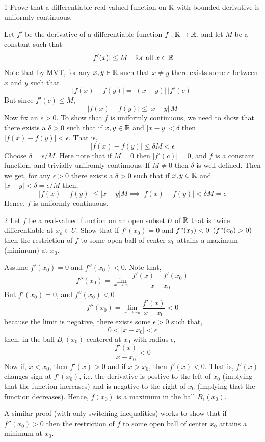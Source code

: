 \documentclass[12pt]{article}
\begin{document}


\begin{problem}{1}
    Prove that a differentiable real-valued function on $\mathbb R$ with bounded derivative is uniformly continuous.
\end{problem}

\begin{solution}
    \bbni

    Let $f'$ be the derivative of a differentiable function $f: \mathbb R \to \mathbb R$, and let $M$ be a constant such that 
    \[|f'(x)| \leq M \quad \text{for all $x \in \mathbb R$}\] 
    Note that by MVT, for any $x, y \in \mathbb R$ such that $x \neq y$ there exists some $c$ between $x$ and $y$ such that 
    \[|f(x) - f(y)| = |(x - y)| \,|f'(c)|\]
    But since $f'(c) \leq M$, 
    \[|f(x) - f(y)| \leq |x - y| \, M\]
    Now fix an $\epsilon >0$. To show that $f$ is uniformly continuous, we need to show that there exists a $\delta >0$ such that if $x, y \in \mathbb R$ and $|x -  y| < \delta$ then $|f(x) - f(y)| < \epsilon$. That is, 
    \[|f(x) - f(y)| \leq  \delta M < \epsilon\]
    Choose $\delta = \epsilon /M$.  Here note that if $M = 0$ then $|f'(c)| = 0$, and $f$ is a constant function, and trivially unifromly continuous. If $M \neq 0$ then $\delta$ is well-defined. Then we get, for any
    $\epsilon > 0$ there exists a $\delta > 0$ such that if $x, y \in \mathbb R$ and $|x - y| < \delta = \epsilon /M$ then, 
    \[|f(x) - f(y)| \leq  |x-y| M \implies |f(x) - f(y)| < \delta M = \epsilon\]
    Hence, $f$ is uniformly continuous. 
\end{solution}

\newpage 

\begin{problem}{2}
    Let $f$ be a real-valued function on an open subset $U$ of $\mathbb R$ that is twice differentiable at $x_o \in U$. Show that if $f'(x_0) = 0$ and $f"(x_0) < 0$ $(f" (x_0) > 0)$ then the restriction of $f$ to some open ball of center $x_0$ attains a maximum (minimum) at $x_0$.
\end{problem}

\begin{solution}
    \bbni

    Assume $f'(x_0) =0$ and $f''(x_0) < 0$. Note that, 
    \[f''(x_0) = \underset{x \to x_0}{\lim} \frac{f'(x) - f'(x_0)}{x-x_0}\]
    But $f'(x_0) = 0$, and $f''(x_0) < 0$
    \[f''(x_0) = \underset{x \to x_0}{\lim} \frac{f'(x)}{x-x_0}< 0 \]
    because the limit is negative, there exists some $\epsilon > 0$ such that, 
    \[0 < |x- x_0| < \epsilon\]
    then, in the ball $B_\epsilon(x_0)$ centered at $x_0$ with radius $\epsilon$, 
    \[\frac{f'(x)}{x-x_0} < 0\]
   Now if, $x < x_0$, then $f'(x) > 0$ and if $x > x_0$, then $f'(x) < 0$. That is, $f'(x)$ changes sign at $f'(x_0)$, i.e. the derivative is postive to the left of $x_0$ (implying that the function increases) and is negative to the right of $x_0$ (implying that the function decreases). Hence, $f(x_0)$ is a maximum in the ball $B_\epsilon(x_0)$. 

   A similar proof (with only switching inequalities) works to show that if $f''(x_0) > 0$ then the restriction of $f$ to some open ball of center $x_0$ attains a minimum at $x_0$. 
\end{solution}
\end{document}
